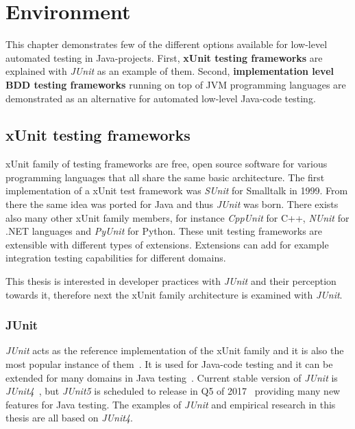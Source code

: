 \chapter{Environment}
\label{chapter:environment}
This chapter demonstrates few of the different options available for low-level automated testing in Java-projects. First,
\textbf{xUnit testing frameworks} are explained with \textit{JUnit} as an example of them. Second, \textbf{implementation level BDD testing frameworks}
running on top of JVM programming languages are demonstrated as an alternative for automated low-level Java-code testing.

\section{xUnit testing frameworks} %
    xUnit family of testing frameworks are free, open source software for various programming languages that
    all share the same basic architecture. The first implementation of a xUnit test framework was \textit{SUnit}
    for Smalltalk in 1999.  From there the same idea was ported for Java and thus \textit{JUnit} was born. There exists also many other
    xUnit family members, for instance \textit{CppUnit} for C++, \textit{NUnit} for .NET languages and \textit{PyUnit} for Python.
    These unit testing frameworks are extensible with different types of extensions. Extensions can add for example integration testing capabilities
    for different domains. ~\cite{hamill2004unit}

    This thesis is interested in developer practices with \textit{JUnit} and their perception towards it, therefore next the xUnit family architecture
    is examined with \textit{JUnit}.

    \subsection{JUnit}
    \textit{JUnit} acts as the reference implementation of the xUnit family and it is also the most popular instance of them~\cite{hamill2004unit}.
    It is used for Java-code testing and it can be extended for many domains in Java testing~\cite{hamill2004unit}.
    Current stable version of \textit{JUnit} is \textit{JUnit4}~\cite{junit4}, but \textit{JUnit5} is scheduled to release in Q5 of 2017~\cite{junit5schedule}
    providing many new features for Java testing. The examples of \textit{JUnit} and empirical research in this thesis are all based on \textit{JUnit4}.

